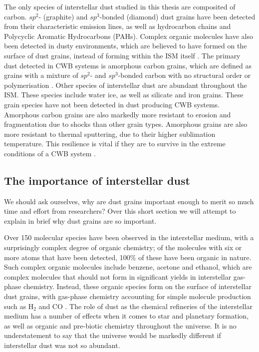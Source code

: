 The only species of interstellar dust studied in this thesis are composited of carbon.
$sp^2$- (graphite) and $sp^3$-bonded (diamond) dust grains have been detected from their characteristic emission lines, as well as hydrocarbon chains and Polycyclic Aromatic Hydrocarbons (PAHs).
Complex organic molecules have also been detected in dusty environments, which are believed to have formed on the surface of dust grains, instead of forming within the ISM itself
\parencite{herbstComplexOrganicInterstellar2009}.
The primary dust detected in CWB systems is amorphous carbon grains, which are defined as grains with a mixture of $sp^2$- and $sp^3$-bonded carbon with no structural order or polymerisation
\parencite{draineInterstellarDustGrains2003}.
Other species of interstellar dust are abundant throughout the ISM.
These species include water ice, as well as silicate and iron grains.
These grain species have not been detected in dust producing CWB systems.
Amorphous carbon grains are also markedly more resistant to erosion and fragmentation due to shocks than other grain types.
Amorphous grains are also more resistant to thermal sputtering, due to their higher sublimation temperature.
This resilience is vital if they are to survive in the extreme conditions of a CWB system
\parencite{draineDestructionMechanismsInterstellar1979}.

\subsection{The importance of interstellar dust}
\label{sec:dustimportance}

We should ask ourselves, why are dust grains important enough to merit so much time and effort from researchers?
Over this short section we will attempt to explain in brief why dust grains are so important.


Over 150 molecular species have been observed in the interstellar medium, with a surprisingly complex degree of organic chemistry; of the molecules with six or more atoms that have been detected, 100\% of these have been organic in nature.
Such complex organic molecules include benzene, acetone and ethanol, which are complex molecules that should not form in significant yields in interstellar gas-phase chemistry.
Instead, these organic species form on the surface of interstellar dust grains, with gas-phase chemistry accounting for simple molecule production such as $\text{H}_2$ and $\text{CO}$
\parencite{herbstComplexOrganicInterstellar2009}.
The role of dust as the chemical refineries of the interstellar medium has a number of effects when it comes to star and planetary formation, as well as organic and pre-biotic chemistry throughout the universe.
It is no understatement to say that the universe would be markedly different if interstellar dust was not so abundant.

